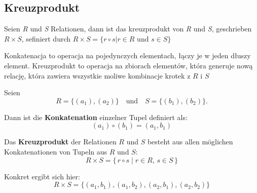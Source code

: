 \subsection{Kreuzprodukt}
Seien \textit{R} und \textit{S} Relationen, dann ist das kreuzprodukt von \textit{R} und \textit{S}, geschrieben $R \times S$, sefiniert durch $R \times S = \{r \circ s | r \in R \text{ und } s \in S\}$

\begin{tcolorbox}[blue, title={Hinweis}]
   Konkatenacja to operacja na pojedynczych elementach, łączy je w jeden dłuszy element. Kreuzprodukt to operacja na zbiorach elementów, która generuje nową relację, która zawiera wszystkie moliwe kombinacje krotek z $R \text{ i } S$
   
\end{tcolorbox}

\begin{tcolorbox}[red, title={Konkatenation vs Kreuzprodukt}]
Seien 
\[
R = \{(a_1), (a_2)\} \quad \text{und} \quad S = \{(b_1), (b_2)\}.
\]

Dann ist die \textbf{Konkatenation} einzelner Tupel definiert als:
\[
(a_1) \circ (b_1) = (a_1, b_1)
\]

Das \textbf{Kreuzprodukt} der Relationen $R$ und $S$ besteht aus allen möglichen Konkatenationen von Tupeln aus $R$ und $S$:
\[
R \times S = \{\, r \circ s \mid r \in R,\, s \in S \,\}
\]

Konkret ergibt sich hier:
\[
R \times S = \{(a_1, b_1), (a_1, b_2), (a_2, b_1), (a_2, b_2)\}
\]
\end{tcolorbox}


